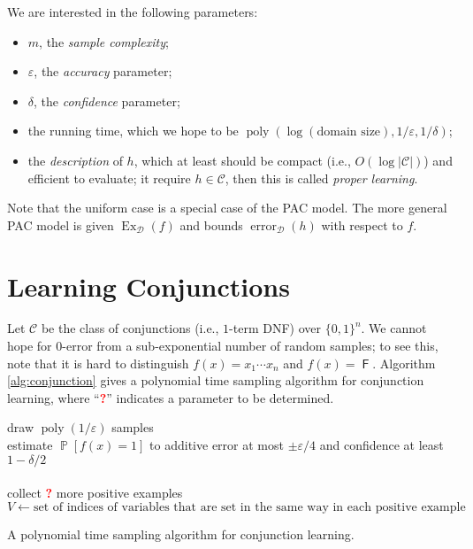 \documentclass[letterpaper, reqno,11pt]{article}
\newcommand{\PP}{\mathop{{}\mathbb{P}}}
\DeclareMathOperator{\F}{\mathsf{F}}
\DeclareMathOperator{\poly}{poly}
\DeclareMathOperator{\Ex}{Ex}
\DeclareMathOperator{\error}{error}
\begin{document}
We are interested in the following parameters:
\begin{itemize}[itemsep=0pt]
  \item $m$, the \emph{sample complexity};
  \item $\varepsilon$, the \emph{accuracy} parameter;
  \item $\delta$, the \emph{confidence} parameter;
  \item the running time, which we hope to be $\poly(\log(\text{domain size}), 1/\varepsilon, 1/\delta)$;
  \item the \emph{description} of $h$, which at least should be compact (i.e., $O(\log |\mathcal C|)$) and efficient to evaluate; it require $h \in \mathcal C$, then this is called \emph{proper learning}.
\end{itemize}
Note that the uniform case is a special case of the PAC model. The more general PAC model is given $\Ex_{\mathcal D}(f)$ and bounds $\error_{\mathcal D}(h)$ with respect to $f$.

\section{Learning Conjunctions}

Let $\mathcal C$ be the class of conjunctions (i.e., $1$-term DNF) over $\{ 0, 1 \}^n$. We cannot hope for $0$-error from a sub-exponential number of random samples; to see this, note that it is hard to distinguish $f(x) = x_1 \cdots x_n$ and $f(x) = \F$. Algorithm \ref{alg:conjunction} gives a polynomial time sampling algorithm for conjunction learning, where ``\textcolor{red}{\bf ?}'' indicates a parameter to be determined.

\begin{algorithm}
  draw $\poly(1/\varepsilon)$ samples \\
  estimate $\PP[f(x) = 1]$ to additive error at most $\pm \varepsilon/4$ and confidence at least $1 - \delta/2$ \\
   \\
  collect \textcolor{red}{\bf ?} more positive examples \\
  $V \leftarrow \text{set of indices of variables that are set in the same way in each positive example}$ \\
  \caption{A polynomial time sampling algorithm for conjunction learning.}
  \label{alg:conjunction}
\end{algorithm}
\end{document}
